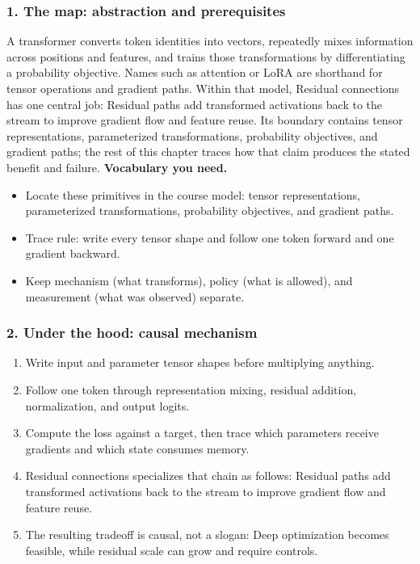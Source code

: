 \subsubsection*{1. The map: abstraction and prerequisites}
A transformer converts token identities into vectors, repeatedly mixes information across positions and features, and trains those transformations by differentiating a probability objective. Names such as attention or LoRA are shorthand for tensor operations and gradient paths.
Within that model, Residual connections has one central job: Residual paths add transformed activations back to the stream to improve gradient flow and feature reuse. Its boundary contains tensor representations, parameterized transformations, probability objectives, and gradient paths; the rest of this chapter traces how that claim produces the stated benefit and failure.
\textbf{Vocabulary you need.}\begin{itemize}
\item Locate these primitives in the course model: tensor representations, parameterized transformations, probability objectives, and gradient paths.
\item Trace rule: write every tensor shape and follow one token forward and one gradient backward.
\item Keep mechanism (what transforms), policy (what is allowed), and measurement (what was observed) separate.
\end{itemize}
\subsubsection*{2. Under the hood: causal mechanism}\begin{enumerate}
\item Write input and parameter tensor shapes before multiplying anything.
\item Follow one token through representation mixing, residual addition, normalization, and output logits.
\item Compute the loss against a target, then trace which parameters receive gradients and which state consumes memory.
\item Residual connections specializes that chain as follows: Residual paths add transformed activations back to the stream to improve gradient flow and feature reuse.
\item The resulting tradeoff is causal, not a slogan: Deep optimization becomes feasible, while residual scale can grow and require controls.
\end{enumerate}
